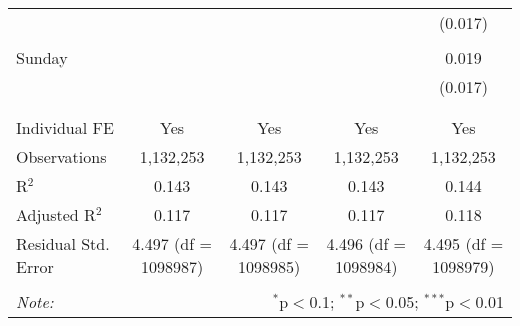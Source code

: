 \documentclass[
]{article}
\begin{document}
\begin{table}[!htbp]
{\begin{tabular}{@{\extracolsep{5pt}}lcccc}
  &  &  &  & (0.017) \\ 
  & & & & \\ 
 Sunday &  &  &  & 0.019 \\ 
  &  &  &  & (0.017) \\ 
  & & & & \\ 
\hline \\[-1.8ex] 
Individual FE & Yes & Yes & Yes & Yes \\ 
Observations & 1,132,253 & 1,132,253 & 1,132,253 & 1,132,253 \\ 
R$^{2}$ & 0.143 & 0.143 & 0.143 & 0.144 \\ 
Adjusted R$^{2}$ & 0.117 & 0.117 & 0.117 & 0.118 \\ 
Residual Std. Error & 4.497 (df = 1098987) & 4.497 (df = 1098985) & 4.496 (df = 1098984) & 4.495 (df = 1098979) \\ 
\hline 
\hline \\[-1.8ex] 
\textit{Note:}  & \multicolumn{4}{r}{$^{*}$p$<$0.1; $^{**}$p$<$0.05; $^{***}$p$<$0.01} \\ 
\end{tabular}
} 
\end{table} 
\newpage
\end{document}
